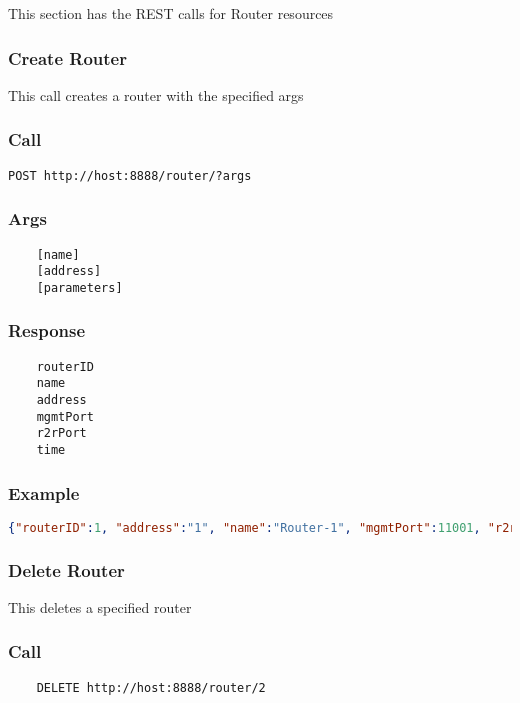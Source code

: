 This section has the REST calls for Router resources

\hr
\subsubsection{Create Router}
This call creates a router with the specified args

\subsubsection*{Call}
\begin{verbatim}
POST http://host:8888/router/?args
\end{verbatim}

\subsubsection*{Args}
\begin{verbatim}
	[name] 
	[address]
	[parameters]
\end{verbatim}

\subsubsection*{Response}
\begin{verbatim}
	routerID 
	name 
	address
	mgmtPort
	r2rPort
	time
\end{verbatim}

\subsubsection*{Example}
\begin{lstlisting}[language=json]
{"routerID":1, "address":"1", "name":"Router-1", "mgmtPort":11001, "r2rPort":11002, "time":1362054061000}
\end{lstlisting}


\hr 
\subsubsection{Delete Router}
This deletes a specified router

\subsubsection*{Call}
\begin{verbatim}
	DELETE http://host:8888/router/2
\end{verbatim}

